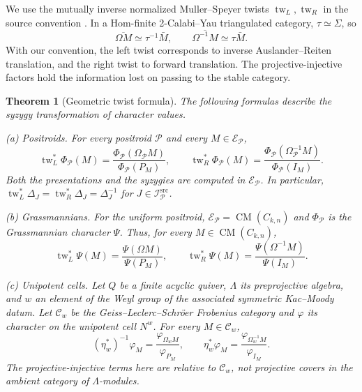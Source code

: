 \documentclass[11pt]{amsart}
\numberwithin{equation}{section}
\newtheorem{theorem}{Theorem}[section]
\theoremstyle{definition}
\theoremstyle{remark}
\newcommand{\op}[1]{\operatorname{#1}}
\newcommand{\E}{\mathcal E}
\newcommand{\Pcal}{\mathcal P}
\newcommand{\CM}{\op{CM}}
\newcommand{\tw}{\op{tw}}
\begin{document}
We use the mutually inverse normalized Muller--Speyer twists
$\tw_L,\tw_R$ in the source convention \cite{MS}. In a Hom-finite
2-Calabi--Yau triangulated category, $\tau\simeq\Sigma$, so
\[ \overline{\Omega M}\simeq\tau^{-1}\bar M,\qquad \overline{\Omega^{-1}M}\simeq\tau\bar M. \]
With our convention, the left twist corresponds to inverse
Auslander--Reiten translation, and the right twist to forward translation.
The projective-injective factors hold the information lost on passing
to the stable category.

\begin{theorem}[Geometric twist formula]\label{thm:geometric}
The following formulas describe the syzygy transformation of character values.

\smallskip\noindent
\textup{(a) Positroids.}
For every positroid $\Pcal$ and every $M\in\E_\Pcal$,
\begin{equation}\label{eq:positroid} \tw_L^*\Phi_\Pcal(M)= \frac{\Phi_\Pcal(\Omega_\Pcal M)}{\Phi_\Pcal(P_M)},\qquad \tw_R^*\Phi_\Pcal(M)= \frac{\Phi_\Pcal(\Omega_\Pcal^{-1}M)}{\Phi_\Pcal(I_M)}.\end{equation}
Both the presentations and the syzygies are computed in
$\E_\Pcal$. In particular,
$\tw_L^*\Delta_J=\tw_R^*\Delta_J=\Delta_J^{-1}$ for
$J\in\mathcal I^{\mathrm{src}}_\Pcal$.

\smallskip\noindent
\textup{(b) Grassmannians.}
For the uniform positroid, $\E_\Pcal=\CM(C_{k,n})$ and
$\Phi_\Pcal$ is the Grassmannian character $\Psi$. Thus, for every
$M\in\CM(C_{k,n})$,
\begin{equation}\label{eq:grass} \tw_L^*\Psi(M)=\frac{\Psi(\Omega M)}{\Psi(P_M)},\qquad \tw_R^*\Psi(M)=\frac{\Psi(\Omega^{-1}M)}{\Psi(I_M)}.\end{equation}

\smallskip\noindent
\textup{(c) Unipotent cells.}
Let $Q$ be a finite acyclic quiver, $\Lambda$ its preprojective
algebra, and $w$ an element of the Weyl group of the associated
symmetric Kac--Moody datum. Let $\mathcal C_w$ be the
Geiss--Leclerc--Schr\"oer Frobenius category and $\varphi$ its
character on the unipotent cell $N^w$. For every $M\in\mathcal C_w$,
\begin{equation}\label{eq:unipotent} (\eta_w^*)^{-1}\varphi_M= \frac{\varphi_{\Omega_w M}}{\varphi_{P_M}},\qquad \eta_w^*\varphi_M= \frac{\varphi_{\Omega_w^{-1}M}}{\varphi_{I_M}}.\end{equation}
The projective-injective terms here are relative to $\mathcal C_w$,
not projective covers in the ambient category of $\Lambda$-modules.
\end{theorem}
\end{document}
